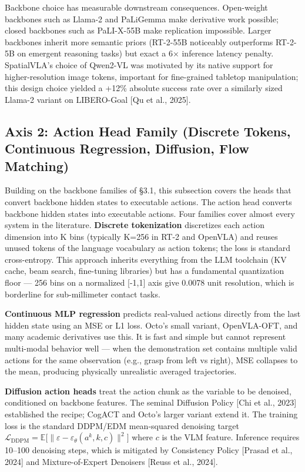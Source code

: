 Backbone choice has measurable downstream consequences. Open-weight backbones such as Llama-2 and PaLiGemma make derivative work possible; closed backbones such as PaLI-X-55B make replication impossible. Larger backbones inherit more semantic priors (RT-2-55B noticeably outperforms RT-2-5B on emergent reasoning tasks) but exact a 6× inference latency penalty. SpatialVLA's choice of Qwen2-VL was motivated by its native support for higher-resolution image tokens, important for fine-grained tabletop manipulation; this design choice yielded a +12\% absolute success rate over a similarly sized Llama-2 variant on LIBERO-Goal {[}Qu et al., 2025{]}.

\subsection{Axis 2: Action Head Family (Discrete Tokens, Continuous Regression, Diffusion, Flow Matching)}\label{axis-2-action-head-family-discrete-tokens-continuous-regression-diffusion-flow-matching}

Building on the backbone families of §3.1, this subsection covers the heads that convert backbone hidden states to executable actions. The action head converts backbone hidden states into executable actions. Four families cover almost every system in the literature. \textbf{Discrete tokenization} discretizes each action dimension into K bins (typically K=256 in RT-2 and OpenVLA) and reuses unused tokens of the language vocabulary as action tokens; the loss is standard cross-entropy. This approach inherits everything from the LLM toolchain (KV cache, beam search, fine-tuning libraries) but has a fundamental quantization floor --- 256 bins on a normalized {[}-1,1{]} axis give 0.0078 unit resolution, which is borderline for sub-millimeter contact tasks.

\textbf{Continuous MLP regression} predicts real-valued actions directly from the last hidden state using an MSE or L1 loss. Octo's small variant, OpenVLA-OFT, and many academic derivatives use this. It is fast and simple but cannot represent multi-modal behavior well --- when the demonstration set contains multiple valid actions for the same observation (e.g., grasp from left vs right), MSE collapses to the mean, producing physically unrealistic averaged trajectories.

\textbf{Diffusion action heads} treat the action chunk as the variable to be denoised, conditioned on backbone features. The seminal Diffusion Policy {[}Chi et al., 2023{]} established the recipe; CogACT and Octo's larger variant extend it. The training loss is the standard DDPM/EDM mean-squared denoising target \(\mathcal{L}_{\text{DDPM}} = \mathbb{E}\big[\|\varepsilon - \varepsilon_\theta(a^k, k, c)\|^2\big]\) where \(c\) is the VLM feature. Inference requires 10--100 denoising steps, which is mitigated by Consistency Policy {[}Prasad et al., 2024{]} and Mixture-of-Expert Denoisers {[}Reuss et al., 2024{]}.

